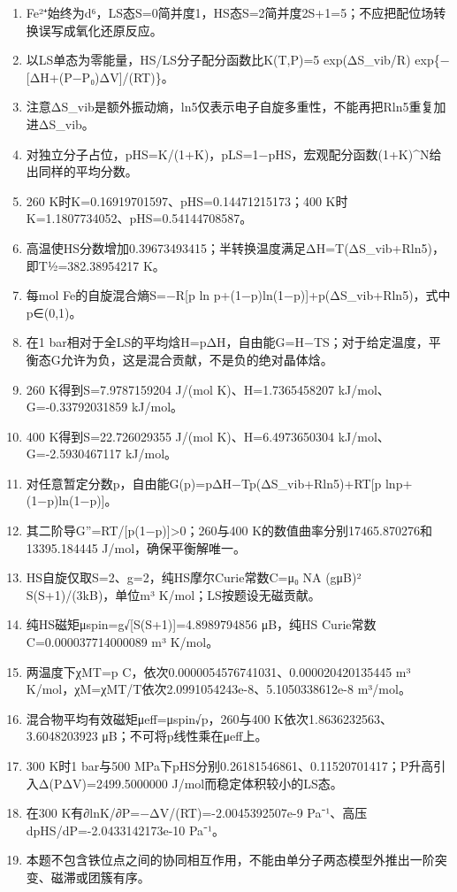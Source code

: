 \documentclass[UTF8,11pt,a4paper]{ctexart}
\begin{document}
\begin{enumerate}
\item Fe²⁺始终为d⁶，LS态S=0简并度1，HS态S=2简并度2S+1=5；不应把配位场转换误写成氧化还原反应。
\item 以LS单态为零能量，HS/LS分子配分函数比K(T,P)=5 exp(ΔS\_vib/R) exp\{−[ΔH+(P−P₀)ΔV]/(RT)\}。
\item 注意ΔS\_vib是额外振动熵，ln5仅表示电子自旋多重性，不能再把Rln5重复加进ΔS\_vib。
\item 对独立分子占位，pHS=K/(1+K)，pLS=1−pHS，宏观配分函数(1+K)\textasciicircum{}N给出同样的平均分数。
\item 260 K时K=0.16919701597、pHS=0.14471215173；400 K时K=1.1807734052、pHS=0.54144708587。
\item 高温使HS分数增加0.39673493415；半转换温度满足ΔH=T(ΔS\_vib+Rln5)，即T½=382.38954217 K。
\item 每mol Fe的自旋混合熵S=−R[p ln p+(1−p)ln(1−p)]+p(ΔS\_vib+Rln5)，式中p∈(0,1)。
\item 在1 bar相对于全LS的平均焓H=pΔH，自由能G=H−TS；对于给定温度，平衡态G允许为负，这是混合贡献，不是负的绝对晶体焓。
\item 260 K得到S=7.9787159204 J/(mol K)、H=1.7365458207 kJ/mol、G=-0.33792031859 kJ/mol。
\item 400 K得到S=22.726029355 J/(mol K)、H=6.4973650304 kJ/mol、G=-2.5930467117 kJ/mol。
\item 对任意暂定分数p，自由能G(p)=pΔH−Tp(ΔS\_vib+Rln5)+RT[p lnp+(1−p)ln(1−p)]。
\item 其二阶导G''=RT/[p(1−p)]>0；260与400 K的数值曲率分别17465.870276和13395.184445 J/mol，确保平衡解唯一。
\item HS自旋仅取S=2、g=2，纯HS摩尔Curie常数C=μ₀ NA (gμB)² S(S+1)/(3kB)，单位m³ K/mol；LS按题设无磁贡献。
\item 纯HS磁矩μspin=g√[S(S+1)]=4.8989794856 μB，纯HS Curie常数C=0.000037714000089 m³ K/mol。
\item 两温度下χMT=p C，依次0.0000054576741031、0.000020420135445 m³ K/mol，χM=χMT/T依次2.0991054243e-8、5.1050338612e-8 m³/mol。
\item 混合物平均有效磁矩μeff=μspin√p，260与400 K依次1.8636232563、3.6048203923 μB；不可将p线性乘在μeff上。
\item 300 K时1 bar与500 MPa下pHS分别0.26181546861、0.11520701417；P升高引入Δ(PΔV)=2499.5000000 J/mol而稳定体积较小的LS态。
\item 在300 K有∂lnK/∂P=−ΔV/(RT)=-2.0045392507e-9 Pa⁻¹、高压dpHS/dP=-2.0433142173e-10 Pa⁻¹。
\item 本题不包含铁位点之间的协同相互作用，不能由单分子两态模型外推出一阶突变、磁滞或团簇有序。
\end{enumerate}
\end{document}
